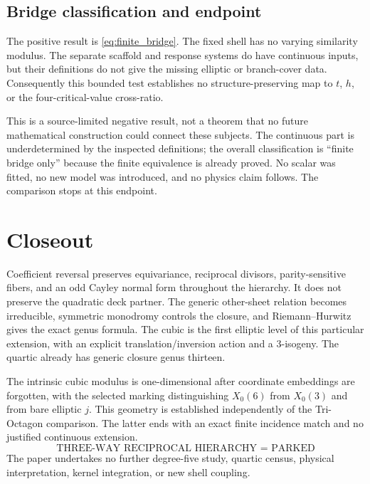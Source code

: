\subsection{Bridge classification and endpoint}\label{sec:bridge_result}
\begin{center}
\end{center}
The positive result is \eqref{eq:finite_bridge}. The fixed shell has no varying similarity modulus. The separate scaffold and response systems do have continuous inputs, but their definitions do not give the missing elliptic or branch-cover data. Consequently this bounded test establishes no structure-preserving map to \(t\), \(h\), or the four-critical-value cross-ratio.

This is a source-limited negative result, not a theorem that no future mathematical construction could connect these subjects. The continuous part is underdetermined by the inspected definitions; the overall classification is ``finite bridge only'' because the finite equivalence is already proved. No scalar was fitted, no new model was introduced, and no physics claim follows. The comparison stops at this endpoint.


\section{Closeout}\label{sec:closeout}
Coefficient reversal preserves equivariance, reciprocal divisors, parity-sensitive fibers, and an odd Cayley normal form throughout the hierarchy. It does not preserve the quadratic deck partner. The generic other-sheet relation becomes irreducible, symmetric monodromy controls the closure, and Riemann--Hurwitz gives the exact genus formula. The cubic is the first elliptic level of this particular extension, with an explicit translation/inversion action and a 3-isogeny. The quartic already has generic closure genus thirteen.

The intrinsic cubic modulus is one-dimensional after coordinate embeddings are forgotten, with the selected marking distinguishing \(X_0(6)\) from \(X_0(3)\) and from bare elliptic \(j\). This geometry is established independently of the Tri-Octagon comparison. The latter ends with an exact finite incidence match and no justified continuous extension.
\begin{equation*}
 \boxed{\text{THREE-WAY RECIPROCAL HIERARCHY = PARKED}}
\end{equation*}
The paper undertakes no further degree-five study, quartic census, physical interpretation, kernel integration, or new shell coupling.
